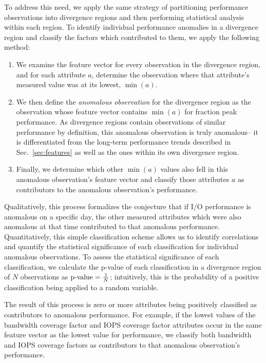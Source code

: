 To address this need, we apply the same strategy of partitioning performance observations into divergence regions and then performing statistical analysis within each region.
To identify individual performance anomalies in a divergence region and classify the factors which contributed to them, we apply the following method:

\begin{enumerate}[leftmargin=*]

\item We examine the feature vector for every observation in the divergence region, and for each attribute $a$, determine the observation where that attribute's measured value was at its lowest, $\min(a)$.

\item We then define the \emph{anomalous observation} for the divergence region as the observation whose feature vector contains $\min(a)$ for fraction peak performance.
As divergence regions contain observations of similar performance by definition, this anomalous observation is truly anomalous-- it is differentiated from the long-term performance trends described in Sec.~\ref{sec:features} as well as the ones within its own divergence region.

\item Finally, we determine which other $\min(a)$ values also fell in this anomalous observation's feature vector and classify those attributes $a$ as contributors to the anomalous observation's performance.

\end{enumerate}

Qualitatively, this process formalizes the conjecture that if I/O performance is anomalous on a specific day, the other measured attributes which were also anomalous at that time contributed to that anomalous performance.
Quantitatively, this simple classification scheme allows us to identify correlations and quantify the statistical significance of each classification for individual anomalous observations.
To assess the statistical significance of each classification, we calculate the p-value of each classification in a divergence region of $N$ observations as $\textup{p-value} = \frac{1}{N}$; intuitively, this is the probability of a positive classification being applied to a random variable.

The result of this process is zero or more attributes being positively classified as contributors to anomalous performance.
For example, if the lowest values of the bandwidth coverage factor and IOPS coverage factor attributes occur in the same feature vector as the lowest value for performance, we classify both bandwidth and IOPS coverage factors as contributors to that anomalous observation's performance.

